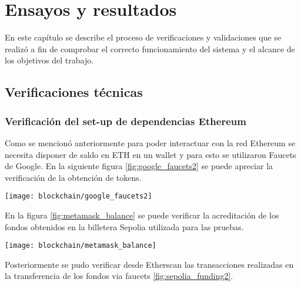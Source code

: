 
\chapter{Ensayos y resultados} %

\label{Chapter4} 

En este capítulo se describe el proceso de verificaciones y validaciones que se realizó a fin de comprobar el correcto funcionamiento del sistema y el alcance de los objetivos del trabajo.


\section{Verificaciones técnicas}



\subsection{Verificación del set-up de dependencias Ethereum}

Como se mencionó anteriormente para poder interactuar con la red Ethereum se necesita disponer de saldo en ETH en un wallet y para esto se utilizaron Faucets de Google. En la siguiente figura \ref{fig:google_faucets2} se puede apreciar la verificación de la obtención de tokens.

\begin{center}
   \texttt{[image: blockchain/google\_faucets2]}
   \label{fig:google_faucets2}
\end{center}

En la figura \ref{fig:metamask_balance} se puede verificar la acreditación de los fondos obtenidos en la billetera Sepolia utilizada para las pruebas. 

\begin{center}
   \texttt{[image: blockchain/metamask\_balance]}
   \label{fig:metamask_balance}
\end{center}

Posteriormente se pudo verificar desde Etherscan las transacciones realizadas en la transferencia de los fondos via faucets \ref{fig:sepolia_funding2}.

